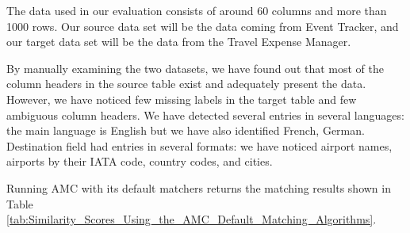 The data used in our evaluation consists of around 60 columns and more than 1000 rows. Our source data set will be the data coming from Event Tracker, and our target data set will be the data from the Travel Expense Manager.

By manually examining the two datasets, we have found out that most of the column headers in the source table exist and adequately present the data. However, we have noticed few missing labels in the target table and few ambiguous column headers. We have detected several entries in several languages: the main language is English but we have also identified French, German. Destination field had entries in several formats: we have noticed airport names, airports by their IATA code, country codes, and cities.

Running AMC with its default matchers returns the matching results shown in Table \ref{tab:Similarity_Scores_Using_the_AMC_Default_Matching_Algorithms}.

\begin{table}[ht]
\centering
{}
\caption{Similarity Scores Using the AMC Default Matching Algorithms}
\label{tab:Similarity_Scores_Using_the_AMC_Default_Matching_Algorithms}
\end{table}

